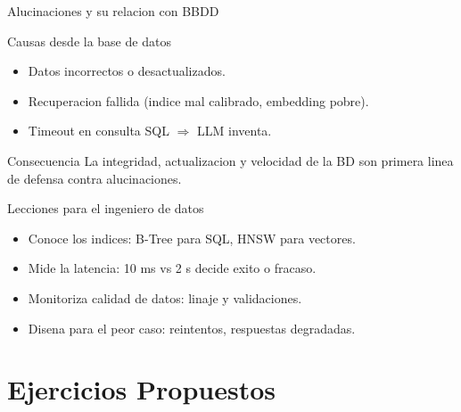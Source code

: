 \documentclass[aspectratio=169, 10pt, xcolor=table]{beamer}
\begin{document}
\begin{frame}{Alucinaciones y su relacion con BBDD}
    \begin{block}{Causas desde la base de datos}
        \begin{itemize}
            \item Datos incorrectos o desactualizados.
            \item Recuperacion fallida (indice mal calibrado, embedding pobre).
            \item Timeout en consulta SQL $\Rightarrow$ LLM inventa.
        \end{itemize}
    \end{block}
    \begin{alertblock}{Consecuencia}
        La integridad, actualizacion y velocidad de la BD son primera linea de defensa contra alucinaciones.
    \end{alertblock}
\end{frame}

\begin{frame}{Lecciones para el ingeniero de datos}
    \begin{itemize}
        \item Conoce los indices: B-Tree para SQL, HNSW para vectores.
        \item Mide la latencia: 10 ms vs 2 s decide exito o fracaso.
        \item Monitoriza calidad de datos: linaje y validaciones.
        \item Disena para el peor caso: reintentos, respuestas degradadas.
    \end{itemize}
\end{frame}

\section{Ejercicios Propuestos}
\end{document}
